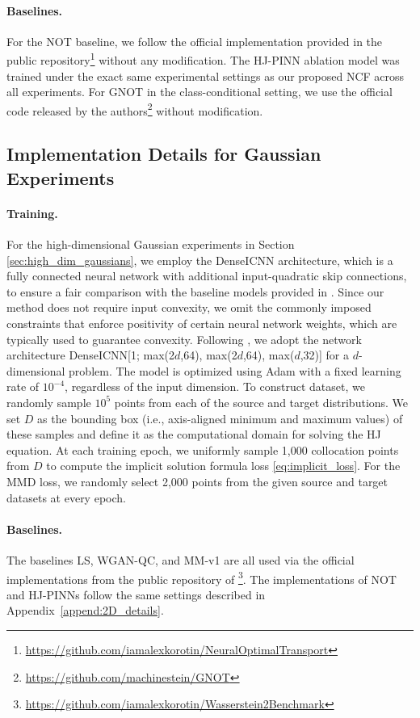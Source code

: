 \documentclass{article} %
\theoremstyle{plain}
\theoremstyle{definition}
\theoremstyle{remark}
\begin{document}
\paragraph{Baselines.}
For the NOT baseline, we follow the official implementation provided in the public repository\footnote{\url{https://github.com/iamalexkorotin/NeuralOptimalTransport}} without any modification.
The HJ-PINN ablation model was trained under the exact same experimental settings as our proposed NCF across all experiments.
For GNOT in the class-conditional setting, we use the official code released by the authors\footnote{\url{https://github.com/machinestein/GNOT}} without modification.

\subsection{Implementation Details for Gaussian Experiments}\label{append:gaussian_details}
\paragraph{Training.}
For the high-dimensional Gaussian experiments in Section \ref{sec:high_dim_gaussians}, we employ the DenseICNN architecture, which is a fully connected neural network with additional input-quadratic skip connections, to ensure a fair comparison with the baseline models provided in \citep{korotin2021neural}. Since our method does not require input convexity, we omit the commonly imposed constraints that enforce positivity of certain neural network weights, which are typically used to guarantee convexity.
Following \cite{korotin2021neural}, we adopt the network architecture DenseICNN[1; max(2$d$,64), max(2$d$,64), max($d$,32)] for a $d$-dimensional problem. The model is optimized using Adam with a fixed learning rate of $10^{-4}$, regardless of the input dimension.
To construct dataset, we randomly sample $10^5$ points from each of the source and target distributions. We set $D$ as the bounding box (i.e., axis-aligned minimum and maximum values) of these samples and define it as the computational domain for solving the HJ equation. At each training epoch, we uniformly sample 1,000 collocation points from $D$ to compute the implicit solution formula loss \eqref{eq:implicit_loss}. For the MMD loss, we randomly select 2,000 points from the given source and target datasets at every epoch.

\paragraph{Baselines.}
The baselines LS, WGAN-QC, and MM-v1 are all used via the official implementations from the public repository of \citet{korotin2021neural}\footnote{\url{https://github.com/iamalexkorotin/Wasserstein2Benchmark}}.
The implementations of NOT and HJ-PINNs follow the same settings described in Appendix~\ref{append:2D_details}.
\end{document}
